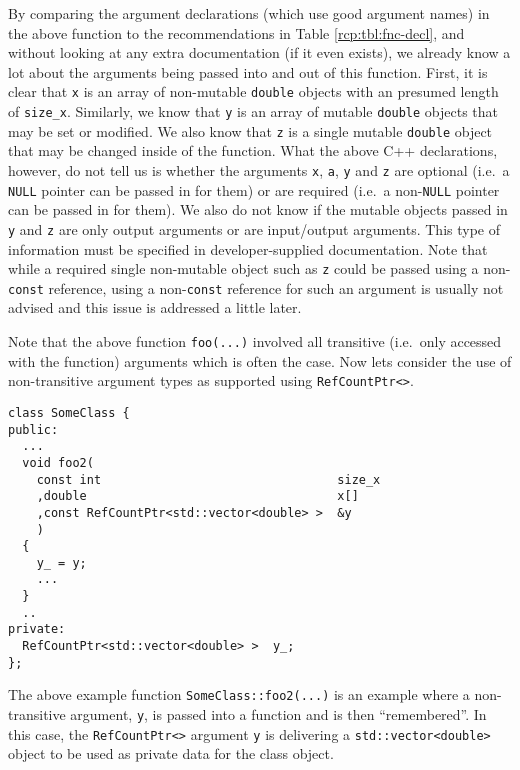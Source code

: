 By comparing the argument declarations (which use good argument names)
in the above function to the recommendations in Table
{}\ref{rcp:tbl:fnc-decl}, and without looking at any extra
documentation (if it even exists), we already know a lot about the
arguments being passed into and out of this function.  First, it is
clear that {}\texttt{x} is an array of non-mutable {}\texttt{double}
objects with an presumed length of {}\texttt{size\_x}.  Similarly, we
know that {}\texttt{y} is an array of mutable {}\texttt{double}
objects that may be set or modified.  We also know that {}\texttt{z}
is a single mutable {}\texttt{double} object that may be changed
inside of the function.  What the above C++ declarations, however, do
not tell us is whether the arguments {}\texttt{x}, {}\texttt{a},
{}\texttt{y} and {}\texttt{z} are optional (i.e.~a {}\texttt{NULL}
pointer can be passed in for them) or are required (i.e.~a
non-{}\texttt{NULL} pointer can be passed in for them).  We also do
not know if the mutable objects passed in {}\texttt{y} and
{}\texttt{z} are only output arguments or are input/output arguments.
This type of information must be specified in developer-supplied
documentation.  Note that while a required single non-mutable object
such as {}\texttt{z} could be passed using a non-{}\texttt{const}
reference, using a non-{}\texttt{const} reference for such an argument
is usually not advised and this issue is addressed a little later.

Note that the above function {}\texttt{foo(...)} involved all
transitive (i.e.~only accessed with the function) arguments which is
often the case.  Now lets consider the use of non-transitive argument
types as supported using {}\texttt{Ref\-Count\-Ptr<>}.

{\scriptsize\begin{verbatim}
class SomeClass {
public:
  ...
  void foo2(
    const int                                 size_x
    ,double                                   x[]
    ,const RefCountPtr<std::vector<double> >  &y
    )
  {
    y_ = y;
    ...
  }
  ..
private:
  RefCountPtr<std::vector<double> >  y_;
};
\end{verbatim}}

{}\noindent{}The above example function
{}\texttt{SomeClass\-::foo2(...)} is an example where a non-transitive
argument, {}\texttt{y}, is passed into a function and is then
``remembered''.  In this case, the {}\texttt{Ref\-Count\-Ptr<>}
argument {}\texttt{y} is delivering a
{}\texttt{std\-::vector<\-double>} object to be used as private data
for the class object.

